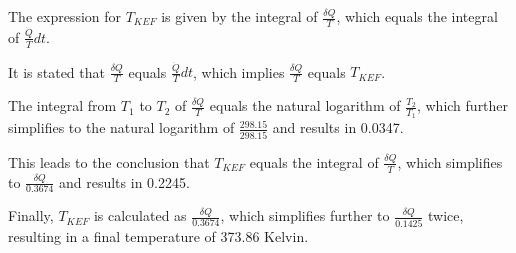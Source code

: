 The expression for \( T_{KEF} \) is given by the integral of \( \frac{\delta Q}{T} \), which equals the integral of \( \frac{\dot{Q}}{T} dt \).

It is stated that \( \frac{\delta Q}{T} \) equals \( \frac{\dot{Q}}{T} dt \), which implies \( \frac{\delta Q}{T} \) equals \( T_{KEF} \).

The integral from \( T_1 \) to \( T_2 \) of \( \frac{\delta Q}{T} \) equals the natural logarithm of \( \frac{T_2}{T_1} \), which further simplifies to the natural logarithm of \( \frac{298.15}{298.15} \) and results in 0.0347.

This leads to the conclusion that \( T_{KEF} \) equals the integral of \( \frac{\delta Q}{T} \), which simplifies to \( \frac{\delta Q}{0.3674} \) and results in 0.2245.

Finally, \( T_{KEF} \) is calculated as \( \frac{\delta Q}{0.3674} \), which simplifies further to \( \frac{\delta Q}{0.1425} \) twice, resulting in a final temperature of 373.86 Kelvin.